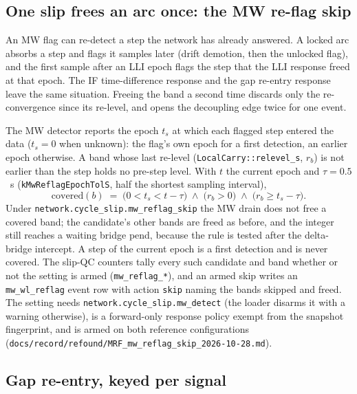 \documentclass[main.tex]{subfiles}
\begin{document}
\subsection{One slip frees an arc once: the MW re-flag skip}\label{sec:net-wire-reflag}

An MW flag can re-detect a step the network has already answered. A locked
arc absorbs a step and flags it samples later (drift demotion, then the
unlocked flag), and the first sample after an LLI epoch flags the step that
the LLI response freed at that epoch. The IF time-difference response and the
gap re-entry response leave the same situation. Freeing the band a second
time discards only the re-convergence since its re-level, and opens the
decoupling edge twice for one event.

The MW detector reports the epoch $t_s$ at which each flagged step entered
the data ($t_s = 0$ when unknown): the flag's own epoch for a first
detection, an earlier epoch otherwise. A band whose last re-level
(\texttt{LocalCarry::relevel\_s}, $r_b$) is not earlier than the step holds
no pre-step level. With $t$ the current epoch and $\tau = 0.5$~s
(\texttt{kMwReflagEpochTolS}, half the shortest sampling interval),
\begin{equation}
\text{covered}(b) \;=\;
\big(0 < t_s < t - \tau\big) \;\wedge\; \big(r_b > 0\big) \;\wedge\;
\big(r_b \ge t_s - \tau\big).
\label{eq:wire-reflag}
\end{equation}
Under \texttt{network.cycle\_slip.mw\_reflag\_skip} the MW drain does not
free a covered band; the candidate's other bands are freed as before, and
the integer still reaches a waiting bridge pend, because the rule is tested
after the delta-bridge intercept. A step of the current epoch is a first
detection and is never covered. The slip-QC counters tally every such
candidate and band whether or not the setting is armed (\texttt{mw\_reflag\_*}),
and an armed skip writes an \texttt{mw\_wl\_reflag} event row with action
\texttt{skip} naming the bands skipped and freed. The setting needs
\texttt{network.cycle\_slip.mw\_detect} (the loader disarms it with a
warning otherwise), is a forward-only response policy exempt from the
snapshot fingerprint, and is armed on both reference configurations
(\texttt{docs/record/refound/MRF\_mw\_reflag\_skip\_2026-10-28.md}).

\subsection{Gap re-entry, keyed per signal}\label{sec:net-wire-gap}
\end{document}
